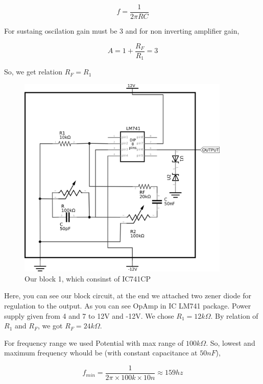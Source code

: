 \documentclass[14pt,a4paper]{extarticle}
\begin{document}
\begin{equation}
\label{eq:orge48d5a7}
  f =\frac{1}{2 \pi RC}
\end{equation}

For sustaing oscilation gain must be 3 and for non inverting amplifier gain, 

\begin{equation}
\label{eq:orgf3838a2}
  A = 1+\frac{R_{F}}{R_{1}} = 3
\end{equation}

So, we get relation \(R_{F}=R_{1}\)

\begin{figure}[ht]
    \centering
    \includegraphics[width=0.9\textwidth]{imgs/sinereal.png}
    \caption{Our block 1, which consinst of IC741CP}
    \label{fig:realsine}
\end{figure}


Here, you can see our block circuit, at the end we attached two zener diode for regulation to the output. As you can see OpAmp in IC LM741 package. Power supply given from  4 and 7 to 12V and -12V. We chose \(R_{1}=12k\Omega\). By relation of \(R_{1}\) and \(R_{F}\), we got \(R_{F}=24k\Omega\).

For frequency range we used Potential with max range of \(100k\Omega\). So, lowest and maximum frequency whould be (with constant capacitance at \(50nF\)),

\begin{equation*}
\label{eq:orgbc48f63}
  f_{min} = \frac{1}{2\pi\times100k\times 10n} \approx 159 hz
\end{equation*}
\end{document}
